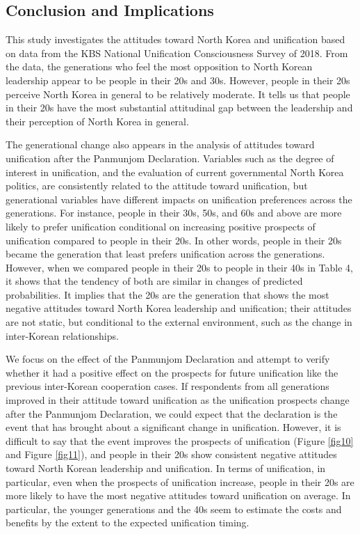 \documentclass[letterpaper,9pt,twocolumn,twoside,]{pinp}
\begin{document}
\hypertarget{conclusion-and-implications}{%
\subsection{Conclusion and
Implications}\label{conclusion-and-implications}}

This study investigates the attitudes toward North Korea and unification
based on data from the KBS National Unification Consciousness Survey of
2018. From the data, the generations who feel the most opposition to
North Korean leadership appear to be people in their 20s and 30s.
However, people in their 20s perceive North Korea in general to be
relatively moderate. It tells us that people in their 20s have the most
substantial attitudinal gap between the leadership and their perception
of North Korea in general.

The generational change also appears in the analysis of attitudes toward
unification after the Panmunjom Declaration. Variables such as the
degree of interest in unification, and the evaluation of current
governmental North Korea politics, are consistently related to the
attitude toward unification, but generational variables have different
impacts on unification preferences across the generations. For instance,
people in their 30s, 50s, and 60s and above are more likely to prefer
unification conditional on increasing positive prospects of unification
compared to people in their 20s. In other words, people in their 20s
became the generation that least prefers unification across the
generations. However, when we compared people in their 20s to people in
their 40s in Table 4, it shows that the tendency of both are similar in
changes of predicted probabilities. It implies that the 20s are the
generation that shows the most negative attitudes toward North Korea
leadership and unification; their attitudes are not static, but
conditional to the external environment, such as the change in
inter-Korean relationships.

We focus on the effect of the Panmunjom Declaration and attempt to
verify whether it had a positive effect on the prospects for future
unification like the previous inter-Korean cooperation cases. If
respondents from all generations improved in their attitude toward
unification as the unification prospects change after the Panmunjom
Declaration, we could expect that the declaration is the event that has
brought about a significant change in unification. However, it is
difficult to say that the event improves the prospects of unification
(Figure \ref{fig10} and Figure \ref{fig11}), and people in their 20s
show consistent negative attitudes toward North Korean leadership and
unification. In terms of unification, in particular, even when the
prospects of unification increase, people in their 20s are more likely
to have the most negative attitudes toward unification on average. In
particular, the younger generations and the 40s seem to estimate the
costs and benefits by the extent to the expected unification timing.
\end{document}
